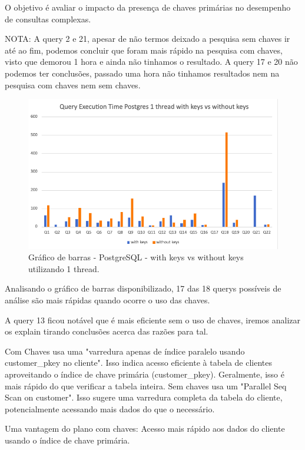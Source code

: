 \documentclass{article}
\begin{document}
O objetivo é avaliar o impacto da presença de chaves primárias no desempenho de consultas complexas.

NOTA: A query 2 e 21, apesar de não termos deixado a pesquisa sem chaves ir até ao fim, podemos concluir que foram mais rápido na pesquisa com chaves, visto que demorou 1 hora e ainda não tinhamos o resultado. A query 17 e 20 não podemos ter conclusões, passado uma hora não tinhamos resultados nem na pesquisa com chaves nem sem chaves.


\begin{figure}[H]
  \centering
  \includegraphics[width=\textwidth]{Graphs/postgres1thread_withkeysvswithoutkeys.png}
  \caption{Gráfico de barras - PostgreSQL - with keys vs without keys utilizando 1 thread.} 
  \label{fig:PKCreation2}
\end{figure}


Analisando o gráfico de barras disponibilizado, 17 das 18 querys possíveis de análise são mais rápidas quando ocorre o uso das chaves.

A query 13 ficou notável que é mais eficiente sem o uso de chaves, iremos analizar os explain tirando conclusões acerca das razões para tal.

Com Chaves usa uma "varredura apenas de índice paralelo usando customer\_pkey no cliente". Isso indica acesso eficiente à tabela de clientes aproveitando o índice de chave primária (customer\_pkey). Geralmente, isso é mais rápido do que verificar a tabela inteira.
Sem chaves usa um "Parallel Seq Scan on customer". Isso sugere uma varredura completa da tabela do cliente, potencialmente acessando mais dados do que o necessário.

Uma vantagem do plano com chaves: Acesso mais rápido aos dados do cliente usando o índice de chave primária.
\end{document}
